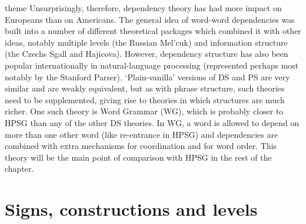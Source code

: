 \documentclass[output=paper]{langsci/langscibook}
\begin{document}
theme Unsurprisingly, therefore, dependency theory has had more impact on Europeans than on
Americans. The general idea of word-word dependencies was built into a number of different
theoretical packages which combined it with other ideas, notably multiple levels (the Russian
Mel’cuk) and information structure (the Czechs Sgall and Hajicova). However, dependency structure
has also been popular internationally in natural-language processing (represented perhaps most
notably by the Stanford Parser).  ‘Plain-vanilla’ versions of DS and PS are very similar and are
weakly equivalent, but as with phrase structure, such theories need to be supplemented, giving rise
to theories in which structures are much richer. One such theory is Word Grammar (WG), which is
probably closer to HPSG than any of the other DS theories. In WG, a word is allowed to depend on
more than one other word (like re-entrance in HPSG) and dependencies are combined with extra
mechanisms for coordination and for word order. This theory will be the main point of comparison
with HPSG in the rest of the chapter.


\section{Signs, constructions and levels}
\end{document}
